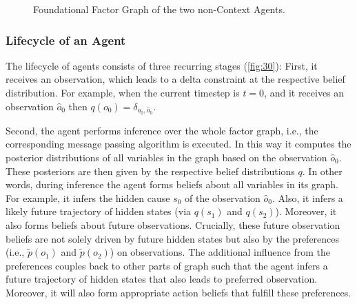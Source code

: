 \begin{figure}[htbp]
{
    }

    \caption{Foundational Factor Graph of the two non-Context Agents.}
    \label{fig:8}
\end{figure}


\subsubsection{Lifecycle of an Agent}

The lifecycle of agents consists of three recurring stages (\cref{fig:30}): First, it receives an observation, which leads to a delta constraint at the respective belief distribution. For example, when the current timestep is \(t=0\), and it receives an observation \(\hat {o}_0\) then \(q(o_0)=\delta_{o_0,\hat {o}_0}\).

Second, the agent performs inference over the whole factor graph, i.e., the corresponding message passing algorithm is executed. In this way it computes the posterior distributions of all variables in the graph based on the observation \(\hat {o}_0\). These posteriors are then given by the respective belief distributions \(q\). In other words, during inference the agent forms beliefs about all variables in its graph. For example, it infers the hidden cause \(s_0\) of the observation \(\hat {o}_0\). Also, it infers a likely future trajectory of hidden states (via \(q(s_1)\) and \(q(s_2)\)). Moreover, it also forms beliefs about future observations. Crucially, these future observation beliefs are not solely driven by future hidden states but also by the preferences (i.e., \(\tilde{p}(o_1)\) and \(\tilde{p}(o_2)\)) on observations. The additional influence from the preferences couples back to other parts of graph such that the agent infers a future trajectory of hidden states that also leads to preferred observation. Moreover, it will also form appropriate action beliefs that fulfill these preferences.

